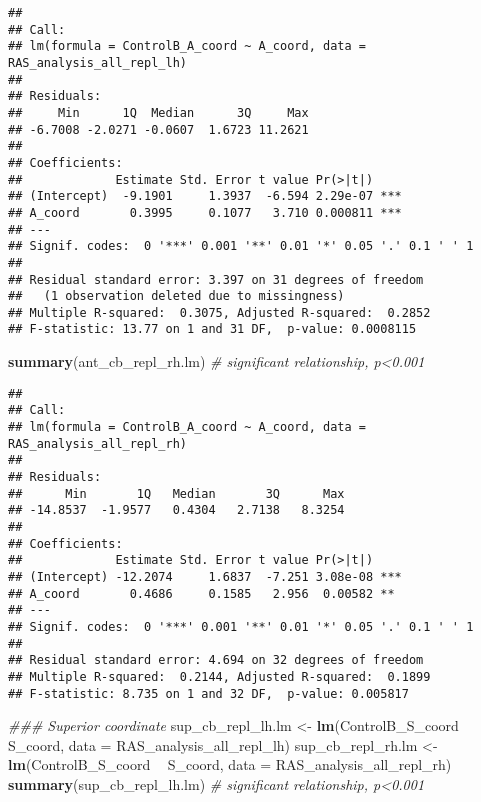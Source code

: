 \documentclass[
]{article}
\newenvironment{Shaded}{\begin{snugshade}}{\end{snugshade}}
\newcommand{\CommentTok}[1]{\textcolor[rgb]{0.56,0.35,0.01}{\textit{#1}}}
\newcommand{\DataTypeTok}[1]{\textcolor[rgb]{0.13,0.29,0.53}{#1}}
\newcommand{\KeywordTok}[1]{\textcolor[rgb]{0.13,0.29,0.53}{\textbf{#1}}}
\newcommand{\NormalTok}[1]{#1}
\newcommand{\OperatorTok}[1]{\textcolor[rgb]{0.81,0.36,0.00}{\textbf{#1}}}
\newcommand{\StringTok}[1]{\textcolor[rgb]{0.31,0.60,0.02}{#1}}
\begin{document}
\begin{verbatim}
## 
## Call:
## lm(formula = ControlB_A_coord ~ A_coord, data = RAS_analysis_all_repl_lh)
## 
## Residuals:
##     Min      1Q  Median      3Q     Max 
## -6.7008 -2.0271 -0.0607  1.6723 11.2621 
## 
## Coefficients:
##             Estimate Std. Error t value Pr(>|t|)    
## (Intercept)  -9.1901     1.3937  -6.594 2.29e-07 ***
## A_coord       0.3995     0.1077   3.710 0.000811 ***
## ---
## Signif. codes:  0 '***' 0.001 '**' 0.01 '*' 0.05 '.' 0.1 ' ' 1
## 
## Residual standard error: 3.397 on 31 degrees of freedom
##   (1 observation deleted due to missingness)
## Multiple R-squared:  0.3075, Adjusted R-squared:  0.2852 
## F-statistic: 13.77 on 1 and 31 DF,  p-value: 0.0008115
\end{verbatim}

\begin{Shaded}
\begin{Highlighting}[]
\KeywordTok{summary}\NormalTok{(ant_cb_repl_rh.lm) }\CommentTok{# significant relationship, p<0.001}
\end{Highlighting}
\end{Shaded}

\begin{verbatim}
## 
## Call:
## lm(formula = ControlB_A_coord ~ A_coord, data = RAS_analysis_all_repl_rh)
## 
## Residuals:
##      Min       1Q   Median       3Q      Max 
## -14.8537  -1.9577   0.4304   2.7138   8.3254 
## 
## Coefficients:
##             Estimate Std. Error t value Pr(>|t|)    
## (Intercept) -12.2074     1.6837  -7.251 3.08e-08 ***
## A_coord       0.4686     0.1585   2.956  0.00582 ** 
## ---
## Signif. codes:  0 '***' 0.001 '**' 0.01 '*' 0.05 '.' 0.1 ' ' 1
## 
## Residual standard error: 4.694 on 32 degrees of freedom
## Multiple R-squared:  0.2144, Adjusted R-squared:  0.1899 
## F-statistic: 8.735 on 1 and 32 DF,  p-value: 0.005817
\end{verbatim}

\begin{Shaded}
\begin{Highlighting}[]
\CommentTok{### Superior coordinate}
\NormalTok{sup_cb_repl_lh.lm <-}\StringTok{ }\KeywordTok{lm}\NormalTok{(ControlB_S_coord }\OperatorTok{~}\StringTok{ }\NormalTok{S_coord, }\DataTypeTok{data =}\NormalTok{ RAS_analysis_all_repl_lh)}
\NormalTok{sup_cb_repl_rh.lm <-}\StringTok{ }\KeywordTok{lm}\NormalTok{(ControlB_S_coord }\OperatorTok{~}\StringTok{ }\NormalTok{S_coord, }\DataTypeTok{data =}\NormalTok{ RAS_analysis_all_repl_rh)}
\KeywordTok{summary}\NormalTok{(sup_cb_repl_lh.lm) }\CommentTok{# significant relationship, p<0.001}
\end{Highlighting}
\end{Shaded}
\end{document}
